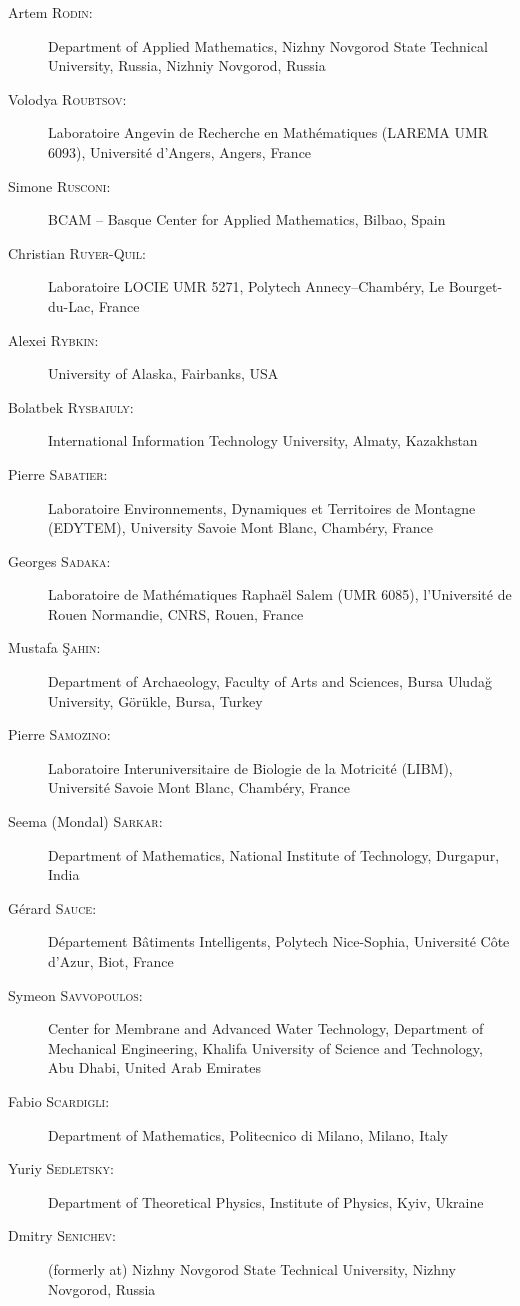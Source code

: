\begin{description}
  \item[Artem \textsc{Rodin}:] Department of Applied Mathematics, Nizhny Novgorod State Technical University, Russia, Nizhniy Novgorod, Russia
  \item[Volodya \textsc{Roubtsov}:] Laboratoire Angevin de Recherche en Math\'ematiques (LAREMA UMR 6093), Universit\'e d'Angers, Angers, France
  \item[Simone \textsc{Rusconi}:] BCAM -- Basque Center for Applied Mathematics, Bilbao, Spain
  \item[Christian \textsc{Ruyer-Quil}:] Laboratoire LOCIE UMR 5271, Polytech Annecy--Chamb\'ery, Le Bourget-du-Lac, France
  \item[Alexei \textsc{Rybkin}:] University of Alaska, Fairbanks, USA
  \item[Bolatbek \textsc{Rysbaiuly}:] International Information Technology University, Almaty, Kazakhstan
  \item[Pierre \textsc{Sabatier}:] Laboratoire Environnements, Dynamiques et Territoires de Montagne (EDYTEM), University Savoie Mont Blanc, Chamb\'ery, France
  \item[Georges \textsc{Sadaka}:] Laboratoire de Math\'ematiques Rapha\"el Salem (UMR 6085), l'Universit\'e de Rouen Normandie, CNRS, Rouen, France
  \item[Mustafa \textsc{\c{S}ahin}:] Department of Archaeology, Faculty of Arts and Sciences, Bursa Uluda\u{g} University, G\"or\"ukle, Bursa, Turkey
  \item[Pierre \textsc{Samozino}:] Laboratoire Interuniversitaire de Biologie de la Motricit\'e (LIBM), Universit\'e Savoie Mont Blanc, Chamb\'ery, France
  \item[Seema (Mondal) \textsc{Sarkar}:] Department of Mathematics, National Institute of Technology, Durgapur, India
  \item[G\'erard \textsc{Sauce}:] D\'epartement B\^atiments Intelligents, Polytech Nice-Sophia, Universit\'e C\^ote d'Azur, Biot, France
  \item[Symeon \textsc{Savvopoulos}:] Center for Membrane and Advanced Water Technology, Department of Mechanical Engineering, Khalifa University of Science and Technology, Abu Dhabi, United Arab Emirates
  \item[Fabio \textsc{Scardigli}:] Department of Mathematics, Politecnico di Milano, Milano, Italy
  \item[Yuriy \textsc{Sedletsky}:] Department of Theoretical Physics, Institute of Physics, Kyiv, Ukraine
  \item[Dmitry \textsc{Senichev}:] (formerly at) Nizhny Novgorod State Technical University, Nizhny Novgorod, Russia

\end{description}
